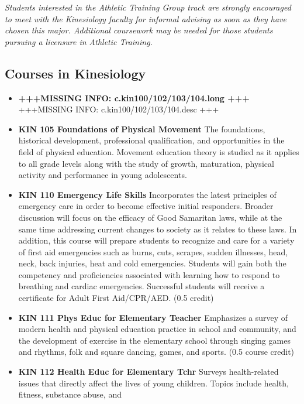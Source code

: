 \documentclass[
  letterpaper,
]{scrbook}
\providecommand{\tightlist}{%
  \setlength{\itemsep}{0pt}\setlength{\parskip}{0pt}}
\begin{document}
\emph{Students interested in the Athletic Training Group track are
strongly encouraged to meet with the Kinesiology faculty for informal
advising as soon as they have chosen this major. Additional coursework
may be needed for those students pursuing a licensure in Athletic
Training. }

\subsection{Courses in Kinesiology}\label{courses-in-kinesiology}

\begin{itemize}
\tightlist
\item
  \textbf{+++MISSING INFO: c.kin100/102/103/104.long +++} +++MISSING
  INFO: c.kin100/102/103/104.desc +++
\item
  \textbf{KIN 105 Foundations of Physical Movement} The foundations,
  historical development, professional qualification, and opportunities
  in the field of physical education. Movement education theory is
  studied as it applies to all grade levels along with the study of
  growth, maturation, physical activity and performance in young
  adolescents.
\item
  \textbf{KIN 110 Emergency Life Skills} Incorporates the latest
  principles of emergency care in order to become effective initial
  responders. Broader discussion will focus on the efficacy of Good
  Samaritan laws, while at the same time addressing current changes to
  society as it relates to these laws. In addition, this course will
  prepare students to recognize and care for a variety of first aid
  emergencies such as burns, cuts, scrapes, sudden illnesses, head,
  neck, back injuries, heat and cold emergencies. Students will gain
  both the competency and proficiencies associated with learning how to
  respond to breathing and cardiac emergencies. Successful students will
  receive a certificate for Adult First Aid/CPR/AED. (0.5 credit)
\item
  \textbf{KIN 111 Phys Educ for Elementary Teacher} Emphasizes a survey
  of modern health and physical education practice in school and
  community, and the development of exercise in the elementary school
  through singing games and rhythms, folk and square dancing, games, and
  sports. (0.5 course credit)
\item
  \textbf{KIN 112 Health Educ for Elementary Tchr} Surveys
  health-related issues that directly affect the lives of young
  children. Topics include health, fitness, substance abuse, and

\end{itemize}
\end{document}
